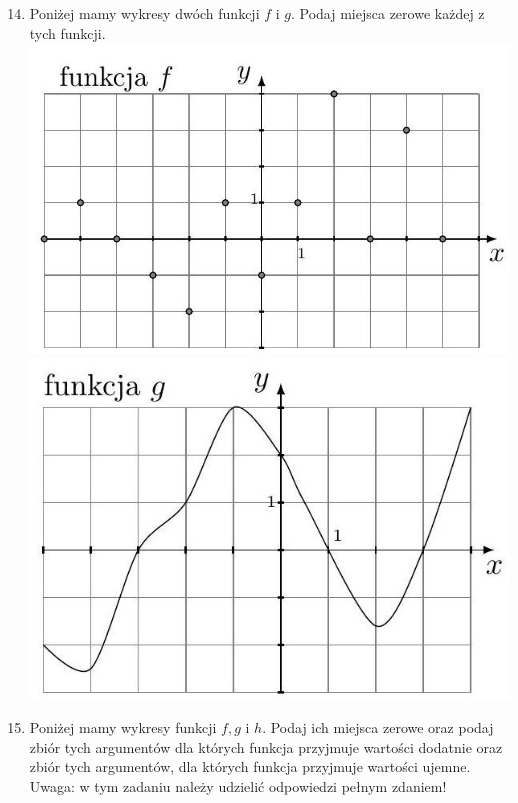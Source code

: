 \documentclass[10pt]{article}
\begin{document}
\begin{enumerate}
  \setcounter{enumi}{13}
  \item Poniżej mamy wykresy dwóch funkcji \(f\) i \(g\). Podaj miejsca zerowe każdej z tych funkcji.\\
\includegraphics[max width=\textwidth, center]{2024_11_21_e9b4faa005d5be2cc318g-126(2)}\\
\includegraphics[max width=\textwidth, center]{2024_11_21_e9b4faa005d5be2cc318g-126}
  \item Poniżej mamy wykresy funkcji \(f, g\) i \(h\). Podaj ich miejsca zerowe oraz podaj zbiór tych argumentów dla których funkcja przyjmuje wartości dodatnie oraz zbiór tych argumentów, dla których funkcja przyjmuje wartości ujemne. Uwaga: w tym zadaniu należy udzielić odpowiedzi pełnym zdaniem!\\

\end{enumerate}
\end{document}
